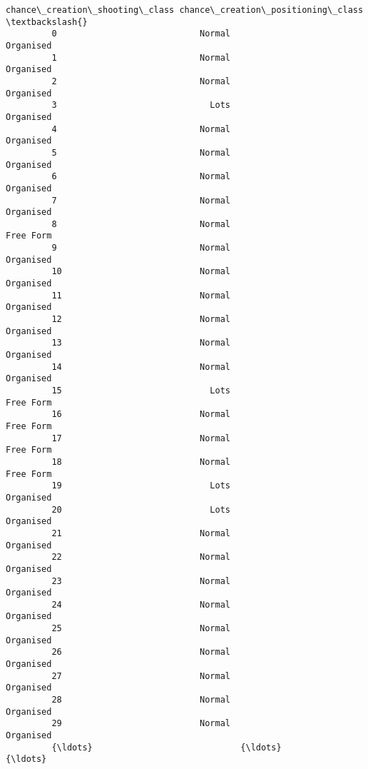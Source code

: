 \documentclass[11pt]{article}
\begin{document}
\begin{Verbatim}[commandchars=\\\{\}]
              chance\_creation\_shooting\_class chance\_creation\_positioning\_class  \textbackslash{}
         0                            Normal                         Organised   
         1                            Normal                         Organised   
         2                            Normal                         Organised   
         3                              Lots                         Organised   
         4                            Normal                         Organised   
         5                            Normal                         Organised   
         6                            Normal                         Organised   
         7                            Normal                         Organised   
         8                            Normal                         Free Form   
         9                            Normal                         Organised   
         10                           Normal                         Organised   
         11                           Normal                         Organised   
         12                           Normal                         Organised   
         13                           Normal                         Organised   
         14                           Normal                         Organised   
         15                             Lots                         Free Form   
         16                           Normal                         Free Form   
         17                           Normal                         Free Form   
         18                           Normal                         Free Form   
         19                             Lots                         Organised   
         20                             Lots                         Organised   
         21                           Normal                         Organised   
         22                           Normal                         Organised   
         23                           Normal                         Organised   
         24                           Normal                         Organised   
         25                           Normal                         Organised   
         26                           Normal                         Organised   
         27                           Normal                         Organised   
         28                           Normal                         Organised   
         29                           Normal                         Organised   
         {\ldots}                             {\ldots}                               {\ldots}   

\end{Verbatim}
\end{document}
